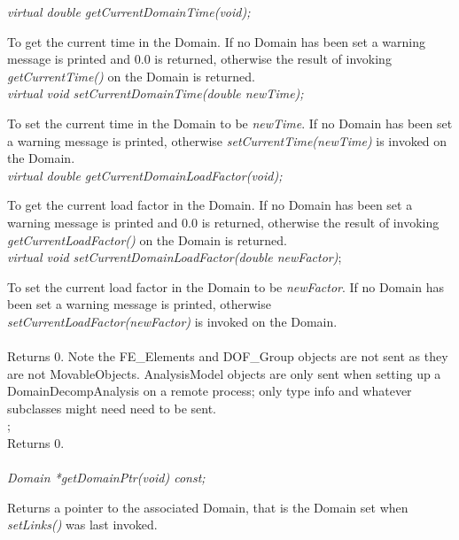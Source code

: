 {\em virtual double getCurrentDomainTime(void);} 

To get the current time in the Domain. If no Domain has been set a
warning message is printed and $0.0$ is returned, otherwise the result
of invoking {\em getCurrentTime()} on the Domain is returned. \\

{\em virtual void   setCurrentDomainTime(double newTime);}

To set the current time in the Domain to be {\em newTime}. If no
Domain has been set a warning message is printed, otherwise 
{\em setCurrentTime(newTime)} is invoked on the Domain. \\

{\em virtual double getCurrentDomainLoadFactor(void);}

To get the current load factor in the Domain. If no Domain has been set a
warning message is printed and $0.0$ is returned, otherwise the result
of invoking {\em getCurrentLoadFactor()} on the Domain is returned. \\

{\em virtual void setCurrentDomainLoadFactor(double newFactor)};

To set the current load factor in the Domain to be {\em newFactor}. If no
Domain has been set a warning message is printed, otherwise 
{\em setCurrentLoadFactor(newFactor)} is invoked on the Domain. \\

\\ 
Returns $0$. Note the FE\_Elements and DOF\_Group objects are not sent
as they are not MovableObjects. AnalysisModel objects are only sent
when setting up a DomainDecompAnalysis on a remote process; only type
info and whatever subclasses might need need to be sent.\\

\indent{};\\
Returns $0$.  \\

  \\
{\em Domain *getDomainPtr(void) const;} 

Returns a pointer to the associated Domain, that is the Domain
set when {\em setLinks()} was last invoked. 


